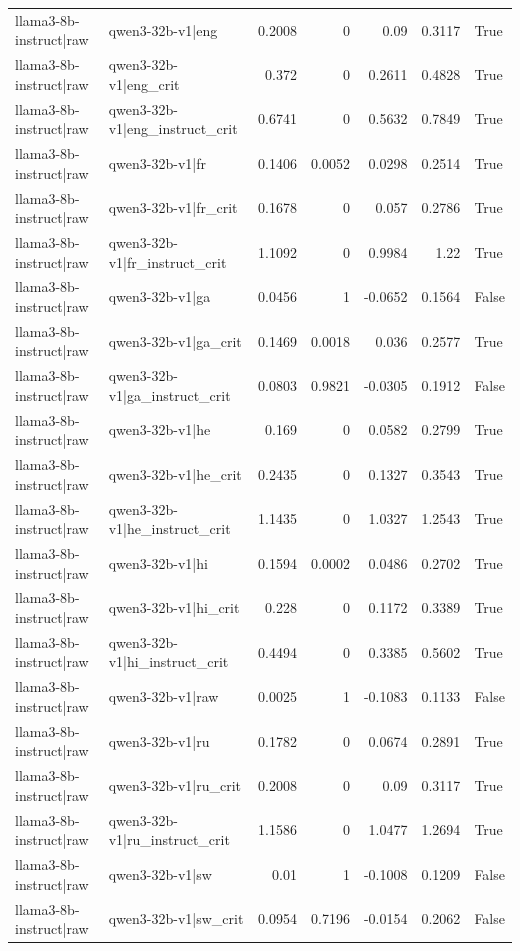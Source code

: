\begin{table}
\begin{tabular}{l l r r r r l}
llama3-8b-instruct|raw & qwen3-32b-v1|eng & 0.2008 & 0 & 0.09 & 0.3117 & True \\
llama3-8b-instruct|raw & qwen3-32b-v1|eng_crit & 0.372 & 0 & 0.2611 & 0.4828 & True \\
llama3-8b-instruct|raw & qwen3-32b-v1|eng_instruct_crit & 0.6741 & 0 & 0.5632 & 0.7849 & True \\
llama3-8b-instruct|raw & qwen3-32b-v1|fr & 0.1406 & 0.0052 & 0.0298 & 0.2514 & True \\
llama3-8b-instruct|raw & qwen3-32b-v1|fr_crit & 0.1678 & 0 & 0.057 & 0.2786 & True \\
llama3-8b-instruct|raw & qwen3-32b-v1|fr_instruct_crit & 1.1092 & 0 & 0.9984 & 1.22 & True \\
llama3-8b-instruct|raw & qwen3-32b-v1|ga & 0.0456 & 1 & -0.0652 & 0.1564 & False \\
llama3-8b-instruct|raw & qwen3-32b-v1|ga_crit & 0.1469 & 0.0018 & 0.036 & 0.2577 & True \\
llama3-8b-instruct|raw & qwen3-32b-v1|ga_instruct_crit & 0.0803 & 0.9821 & -0.0305 & 0.1912 & False \\
llama3-8b-instruct|raw & qwen3-32b-v1|he & 0.169 & 0 & 0.0582 & 0.2799 & True \\
llama3-8b-instruct|raw & qwen3-32b-v1|he_crit & 0.2435 & 0 & 0.1327 & 0.3543 & True \\
llama3-8b-instruct|raw & qwen3-32b-v1|he_instruct_crit & 1.1435 & 0 & 1.0327 & 1.2543 & True \\
llama3-8b-instruct|raw & qwen3-32b-v1|hi & 0.1594 & 0.0002 & 0.0486 & 0.2702 & True \\
llama3-8b-instruct|raw & qwen3-32b-v1|hi_crit & 0.228 & 0 & 0.1172 & 0.3389 & True \\
llama3-8b-instruct|raw & qwen3-32b-v1|hi_instruct_crit & 0.4494 & 0 & 0.3385 & 0.5602 & True \\
llama3-8b-instruct|raw & qwen3-32b-v1|raw & 0.0025 & 1 & -0.1083 & 0.1133 & False \\
llama3-8b-instruct|raw & qwen3-32b-v1|ru & 0.1782 & 0 & 0.0674 & 0.2891 & True \\
llama3-8b-instruct|raw & qwen3-32b-v1|ru_crit & 0.2008 & 0 & 0.09 & 0.3117 & True \\
llama3-8b-instruct|raw & qwen3-32b-v1|ru_instruct_crit & 1.1586 & 0 & 1.0477 & 1.2694 & True \\
llama3-8b-instruct|raw & qwen3-32b-v1|sw & 0.01 & 1 & -0.1008 & 0.1209 & False \\
llama3-8b-instruct|raw & qwen3-32b-v1|sw_crit & 0.0954 & 0.7196 & -0.0154 & 0.2062 & False \\

\end{tabular}
\end{table}
